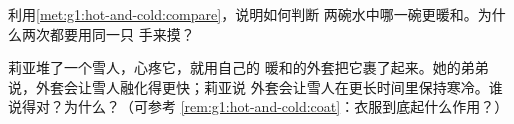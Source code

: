 \begin{exercise}[$\star$]\label{exo:g1:hot-and-cold:8}
利用\cref{met:g1:hot-and-cold:compare}，说明如何判断
两碗水中哪一碗更暖和。为什么两次都要用同一只
手来摸？
\end{exercise}

\begin{exercise}[$\star\star$]\label{exo:g1:hot-and-cold:9}
莉亚堆了一个雪人，心疼它，就用自己的
暖和的外套把它裹了起来。她的弟弟说，外套会让雪人融化得更快；莉亚说
外套会让雪人在更长时间里保持寒冷。谁说得对？为什么？（可参考
\cref{rem:g1:hot-and-cold:coat}：衣服到底起什么作用？）
\end{exercise}

